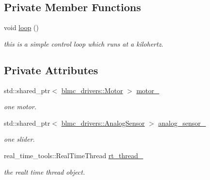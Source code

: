 \subsection*{Private Member Functions}
\begin{DoxyCompactItemize}
\item 
void \hyperlink{classController_a9ec8c2d4a68acccd118537c36894e516}{loop} ()
\begin{DoxyCompactList}\small\item\em this is a simple control loop which runs at a kilohertz. \end{DoxyCompactList}\end{DoxyCompactItemize}
\subsection*{Private Attributes}
\begin{DoxyCompactItemize}
\item 
\mbox{\label{classController_abad7e0e003f885504b2de5e929afd187}} 
std\+::shared\+\_\+ptr$<$ \hyperlink{classblmc__drivers_1_1Motor}{blmc\+\_\+drivers\+::\+Motor} $>$ \hyperlink{classController_abad7e0e003f885504b2de5e929afd187}{motor\+\_\+}
\begin{DoxyCompactList}\small\item\em one motor. \end{DoxyCompactList}\item 
\mbox{\label{classController_a33ba57988a9da049562e61572ae53a05}} 
std\+::shared\+\_\+ptr$<$ \hyperlink{classblmc__drivers_1_1AnalogSensor}{blmc\+\_\+drivers\+::\+Analog\+Sensor} $>$ \hyperlink{classController_a33ba57988a9da049562e61572ae53a05}{analog\+\_\+sensor\+\_\+}
\begin{DoxyCompactList}\small\item\em one slider. \end{DoxyCompactList}\item 
\mbox{\label{classController_abef4676ee65620e3e61fd2fb6107c00e}} 
real\+\_\+time\+\_\+tools\+::\+Real\+Time\+Thread \hyperlink{classController_abef4676ee65620e3e61fd2fb6107c00e}{rt\+\_\+thread\+\_\+}
\begin{DoxyCompactList}\small\item\em the realt time thread object. \end{DoxyCompactList}\end{DoxyCompactItemize}


